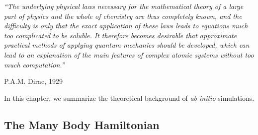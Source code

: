 \epigraph{\singlespacing \it ``The underlying physical laws necessary
for the mathematical theory of a large part of physics and the whole of chemistry
are thus completely known, and the difficulty is only that the exact application
of these laws leads to equations much too complicated to be soluble. It therefore becomes desirable that approximate practical methods of applying quantum
mechanics should be developed, which can lead to an explanation of the main
features of complex atomic systems without too much computation.''}{P.A.M. Dirac, 1929}

In this chapter, we summarize the theoretical background of {\it ab initio} simulations.

\subsection{The Many Body Hamiltonian}

